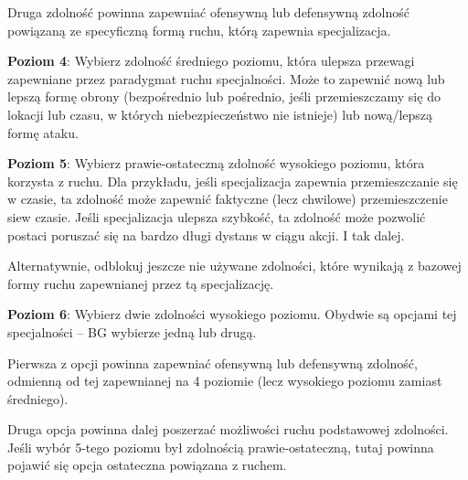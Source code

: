 Druga zdolność powinna zapewniać ofensywną lub defensywną zdolność powiązaną ze specyficzną formą ruchu, którą zapewnia specjalizacja.

\textbf{Poziom 4}: Wybierz zdolność średniego poziomu, która ulepsza przewagi zapewniane przez paradygmat ruchu specjalności. Może to zapewnić nową lub lepszą formę obrony (bezpośrednio lub pośrednio, jeśli przemieszczamy się do lokacji lub czasu, w których niebezpieczeństwo nie istnieje) lub nową/lepszą formę ataku.

\textbf{Poziom 5}: Wybierz prawie-ostateczną zdolność wysokiego poziomu, która korzysta z ruchu. Dla przykładu, jeśli specjalizacja zapewnia przemieszczanie się w czasie, ta zdolność może zapewnić faktyczne (lecz chwilowe) przemieszczenie siew czasie. Jeśli specjalizacja ulepsza szybkość, ta zdolność może pozwolić postaci poruszać się na bardzo długi dystans w ciągu akcji. I tak dalej.

Alternatywnie, odblokuj jeszcze nie używane zdolności, które wynikają z bazowej formy ruchu zapewnianej przez tą specjalizację. 

\textbf{Poziom 6}: Wybierz dwie zdolności wysokiego poziomu. Obydwie są opcjami tej specjalności – BG wybierze jedną lub drugą.

Pierwsza z opcji powinna zapewniać ofensywną lub defensywną zdolność, odmienną od tej zapewnianej na 4 poziomie (lecz wysokiego poziomu zamiast średniego).

Druga opcja powinna dalej poszerzać możliwości ruchu podstawowej zdolności. Jeśli wybór 5-tego poziomu był zdolnością prawie-ostateczną, tutaj powinna pojawić się opcja ostateczna powiązana z ruchem.